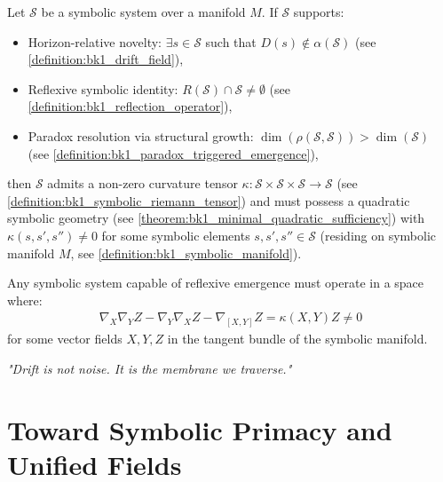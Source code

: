 \begin{theorem}
\label{theorem:bk1_symbolic_emergence_theorem_thermodynamics}
Let $\mathcal{S}$ be a symbolic system over a manifold $M$. If $\mathcal{S}$ supports:
\begin{itemize}
  \item Horizon-relative novelty: $\exists s \in \mathcal{S}$ such that $D(s) \notin \alpha(\mathcal{S})$ (see \ref{definition:bk1_drift_field}),
  \item Reflexive symbolic identity: $R(\mathcal{S}) \cap \mathcal{S} \neq \emptyset$ (see \ref{definition:bk1_reflection_operator}),
  \item Paradox resolution via structural growth: $\dim(\rho(\mathcal{S}, \mathcal{S})) > \dim(\mathcal{S})$ (see \ref{definition:bk1_paradox_triggered_emergence}),
\end{itemize}
then $\mathcal{S}$ admits a non-zero curvature tensor $\kappa: \mathcal{S} \times \mathcal{S} \times \mathcal{S} \to \mathcal{S}$ (see \ref{definition:bk1_symbolic_riemann_tensor}) and must possess a quadratic symbolic geometry (see \ref{theorem:bk1_minimal_quadratic_sufficiency}) with $\kappa(s,s',s'') \neq 0$ for some symbolic elements $s, s', s'' \in \mathcal{S}$ (residing on symbolic manifold $M$, see \ref{definition:bk1_symbolic_manifold}).
\end{theorem}
\begin{corollary}
\label{corollary:bk1_necessity_of_non_euclidean_symbolic_space}
Any symbolic system capable of reflexive emergence must operate in a space where:
\begin{align}
\nabla_X \nabla_Y Z - \nabla_Y \nabla_X Z - \nabla_{[X,Y]}Z = \kappa(X,Y)Z \neq 0
\end{align}
for some vector fields $X, Y, Z$ in the tangent bundle of the symbolic manifold.
\end{corollary}
\begin{flushright}
\textit{"Drift is not noise. It is the membrane we traverse."}
\end{flushright}
\section{Toward Symbolic Primacy and Unified Fields}
\label{sec:bk1_toward_symbolic_primacy_and_unified_fields}
